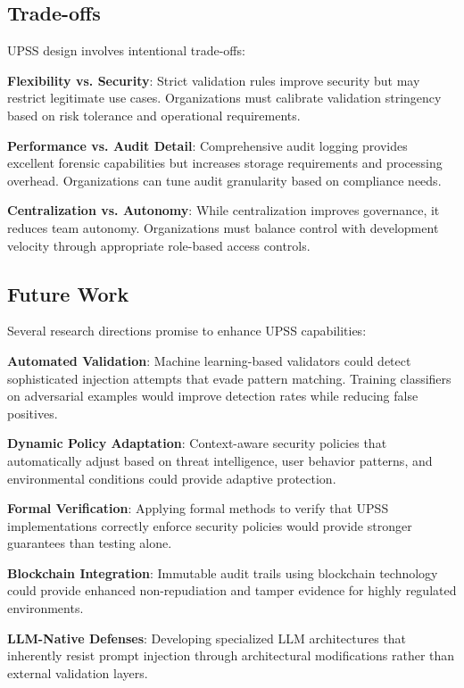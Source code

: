\subsection{Trade-offs}

UPSS design involves intentional trade-offs:

\textbf{Flexibility vs. Security}: Strict validation rules improve security but may restrict legitimate use cases. Organizations must calibrate validation stringency based on risk tolerance and operational requirements.

\textbf{Performance vs. Audit Detail}: Comprehensive audit logging provides excellent forensic capabilities but increases storage requirements and processing overhead. Organizations can tune audit granularity based on compliance needs.

\textbf{Centralization vs. Autonomy}: While centralization improves governance, it reduces team autonomy. Organizations must balance control with development velocity through appropriate role-based access controls.

\subsection{Future Work}

Several research directions promise to enhance UPSS capabilities:

\textbf{Automated Validation}: Machine learning-based validators could detect sophisticated injection attempts that evade pattern matching. Training classifiers on adversarial examples would improve detection rates while reducing false positives.

\textbf{Dynamic Policy Adaptation}: Context-aware security policies that automatically adjust based on threat intelligence, user behavior patterns, and environmental conditions could provide adaptive protection.

\textbf{Formal Verification}: Applying formal methods to verify that UPSS implementations correctly enforce security policies would provide stronger guarantees than testing alone.

\textbf{Blockchain Integration}: Immutable audit trails using blockchain technology could provide enhanced non-repudiation and tamper evidence for highly regulated environments.

\textbf{LLM-Native Defenses}: Developing specialized LLM architectures that inherently resist prompt injection through architectural modifications rather than external validation layers.

